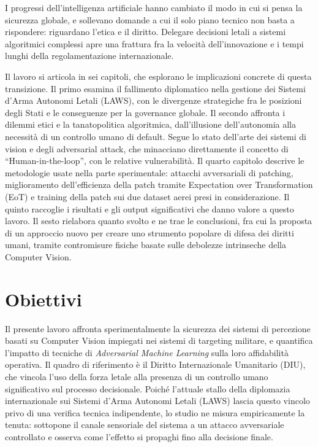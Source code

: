 \documentclass[a4paper,12pt]{report}
\begin{document}
 
I progressi dell'intelligenza artificiale hanno cambiato il modo in cui si pensa la sicurezza globale, e sollevano domande a cui il solo piano tecnico non basta a rispondere: riguardano l'etica e il diritto. Delegare decisioni letali a sistemi algoritmici complessi apre una frattura fra la velocità dell'innovazione e i tempi lunghi della regolamentazione internazionale.
 
Il lavoro si articola in sei capitoli, che esplorano le implicazioni concrete di questa transizione. Il primo esamina il fallimento diplomatico nella gestione dei Sistemi d'Arma Autonomi Letali (LAWS), con le divergenze strategiche fra le posizioni degli Stati e le conseguenze per la governance globale. Il secondo affronta i dilemmi etici e la tanatopolitica algoritmica, dall'illusione dell'autonomia alla necessità di un controllo umano di default. Segue lo stato dell'arte dei sistemi di vision e degli adversarial attack, che minacciano direttamente il concetto di ``Human-in-the-loop'', con le relative vulnerabilità. Il quarto capitolo descrive le metodologie usate nella parte sperimentale: attacchi avversariali di patching, miglioramento dell'efficienza della patch tramite Expectation over Transformation (EoT) e training della patch sui due dataset aerei presi in considerazione. Il quinto raccoglie i risultati e gli output significativi che danno valore a questo lavoro. Il sesto rielabora quanto svolto e ne trae le conclusioni, fra cui la proposta di un approccio nuovo per creare uno strumento popolare di difesa dei diritti umani, tramite contromisure fisiche basate sulle debolezze intrinseche della Computer Vision.
 
\section{Obiettivi}
Il presente lavoro affronta sperimentalmente la sicurezza dei sistemi di percezione basati su Computer Vision impiegati nei sistemi di targeting militare, e quantifica l'impatto di tecniche di \textit{Adversarial Machine Learning} sulla loro affidabilità operativa. Il quadro di riferimento è il Diritto Internazionale Umanitario (DIU), che vincola l'uso della forza letale alla presenza di un controllo umano significativo sul processo decisionale. Poiché l'attuale stallo della diplomazia internazionale sui Sistemi d'Arma Autonomi Letali (LAWS) lascia questo vincolo privo di una verifica tecnica indipendente, lo studio ne misura empiricamente la tenuta: sottopone il canale sensoriale del sistema a un attacco avversariale controllato e osserva come l'effetto si propaghi fino alla decisione finale.
 
\end{document}
